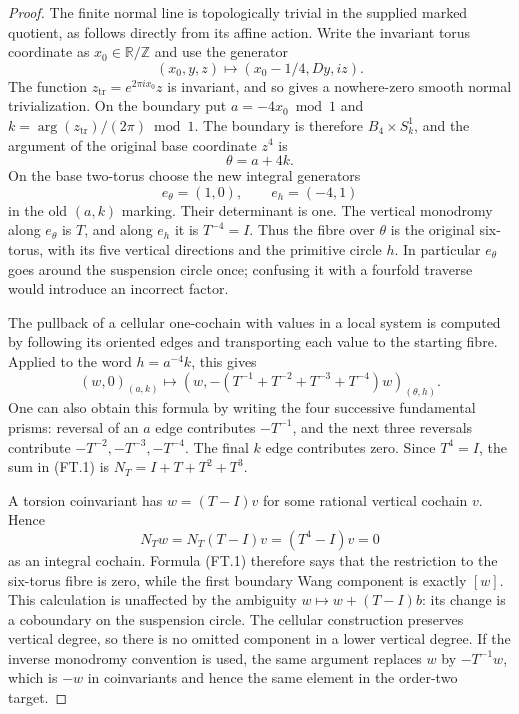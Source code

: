 \begin{proof}
The finite normal line is topologically trivial in the supplied
marked quotient, as follows directly from its affine action. Write
the invariant torus coordinate as $x_0\in\mathbb R/\mathbb Z$ and
use the generator
\[
 (x_0,y,z)\longmapsto(x_0-1/4,Dy,iz).
\]
The function $z_{\mathrm{tr}}=e^{2\pi i x_0}z$ is invariant, and so gives a
nowhere-zero smooth normal trivialization. On the boundary put
$a=-4x_0\bmod1$ and $k=\arg(z_{\mathrm{tr}})/(2\pi)\bmod1$.
The boundary is therefore $B_4\times S^1_k$, and the argument
of the original base coordinate $z^4$ is
\[
             \theta=a+4k.
\]
On the base two-torus choose the new integral generators
\[
 e_\theta=(1,0),\qquad e_h=(-4,1)
\]
in the old $(a,k)$ marking. Their determinant is one. The vertical
monodromy along $e_\theta$ is $T$, and along $e_h$ it is
$T^{-4}=I$. Thus the fibre over $\theta$ is the original
six-torus, with its five vertical directions and the primitive
circle $h$. In particular $e_\theta$ goes around the suspension
circle once; confusing it with a fourfold traverse would introduce
an incorrect factor.

The pullback of a cellular one-cochain with values in a local
system is computed by following its oriented edges and transporting
each value to the starting fibre. Applied to the word
$h=a^{-4}k$, this gives
\[
 (w,0)_{(a,k)}\longmapsto
 \left(w,-(T^{-1}+T^{-2}+T^{-3}+T^{-4})w\right)_{(\theta,h)}.
\tag{FT.1}
\]
One can also obtain this formula by writing the four successive
fundamental prisms: reversal of an $a$ edge contributes $-T^{-1}$,
and the next three reversals contribute $-T^{-2},-T^{-3},-T^{-4}$.
The final $k$ edge contributes zero. Since $T^4=I$, the sum in
\textup{(FT.1)} is $N_T=I+T+T^2+T^3$.

A torsion coinvariant has $w=(T-I)v$ for some rational vertical
cochain $v$. Hence
\[
 N_Tw=N_T(T-I)v=(T^4-I)v=0
\]
as an integral cochain. Formula \textup{(FT.1)} therefore says
that the restriction to the six-torus fibre is zero, while the
first boundary Wang component is exactly $[w]$. This calculation
is unaffected by the ambiguity $w\mapsto w+(T-I)b$: its change is
a coboundary on the suspension circle. The cellular construction
preserves vertical degree, so there is no omitted component in a
lower vertical degree. If the inverse monodromy convention is used,
the same argument replaces $w$ by $-T^{-1}w$, which is $-w$ in
coinvariants and hence the same element in the order-two target.


\end{proof}
